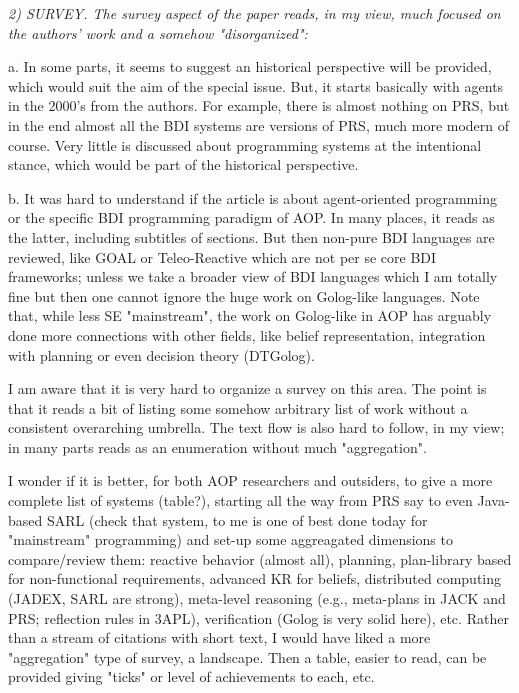 \documentclass[12pt]{article}
\newenvironment{reviews}{\bigskip\itshape}{\upshape\bigskip}
\begin{document}
\begin{reviews}
2) SURVEY. The survey aspect of the paper reads, in my view, much focused on the authors' work and a somehow "disorganized":

a. In some parts, it seems to suggest an historical perspective will be provided, which would suit the aim of the special issue. But, it starts basically with agents in the 2000's from the authors. For example, there is almost nothing on PRS, but in the end almost all the BDI systems are versions of PRS, much more modern of course. Very little is discussed about programming systems at the intentional stance, which would be part of the historical perspective.

b. It was hard to understand if the article is about agent-oriented programming or the specific BDI programming paradigm of AOP. In many places, it reads as the latter, including subtitles of sections. But then non-pure BDI languages are reviewed, like GOAL or Teleo-Reactive which are not per se core BDI frameworks; unless we take a broader view of BDI languages which I am totally fine but then one cannot ignore the huge work on Golog-like languages. Note that, while less SE "mainstream", the work on Golog-like in AOP has arguably done more connections with other fields, like belief representation, integration with planning or even decision theory (DTGolog). 

I am aware that it is very hard to organize a survey on this area. The point is that it reads a bit of listing some somehow arbitrary list of work without a consistent overarching umbrella. The text flow is also hard to follow, in my view; in many parts reads  as an enumeration without much "aggregation".

I wonder if it is better, for both AOP researchers and outsiders, to give a more complete list of systems (table?), starting all the way from PRS say to even Java-based SARL (check that system, to me is one of best done today for "mainstream" programming) and set-up some aggreagated dimensions to compare/review them: reactive behavior (almost all), planning, plan-library based for non-functional requirements, advanced KR for beliefs, distributed computing (JADEX, SARL are strong), meta-level reasoning (e.g., meta-plans in JACK and PRS; reflection rules in 3APL), verification (Golog is very solid here), etc. Rather than a stream of citations with short text, I would have liked a more "aggregation" type of survey, a landscape. Then a table, easier to read, can be provided giving "ticks" or level of achievements to each, etc. 


\end{reviews}
\end{document}
